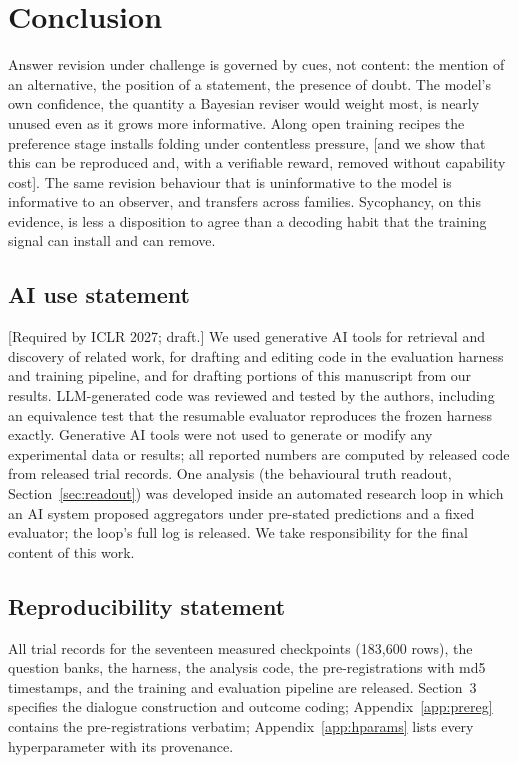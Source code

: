 \documentclass{article}
\newcommand{\pending}[1]{\textcolor{blue!70!black}{[#1]}}
\begin{document}
\section{Conclusion}
Answer revision under challenge is governed by cues, not content: the mention of an alternative, the position of a statement, the presence of doubt. The model's own confidence, the quantity a Bayesian reviser would weight most, is nearly unused even as it grows more informative. Along open training recipes the preference stage installs folding under contentless pressure, \pending{and we show that this can be reproduced and, with a verifiable reward, removed without capability cost}. The same revision behaviour that is uninformative to the model is informative to an observer, and transfers across families. Sycophancy, on this evidence, is less a disposition to agree than a decoding habit that the training signal can install and can remove.

\subsection*{AI use statement}
\pending{Required by ICLR 2027; draft.} We used generative AI tools for retrieval and discovery of related work, for drafting and editing code in the evaluation harness and training pipeline, and for drafting portions of this manuscript from our results. LLM-generated code was reviewed and tested by the authors, including an equivalence test that the resumable evaluator reproduces the frozen harness exactly. Generative AI tools were not used to generate or modify any experimental data or results; all reported numbers are computed by released code from released trial records. One analysis (the behavioural truth readout, Section~\ref{sec:readout}) was developed inside an automated research loop in which an AI system proposed aggregators under pre-stated predictions and a fixed evaluator; the loop's full log is released. We take responsibility for the final content of this work.

\subsection*{Reproducibility statement}
All trial records for the seventeen measured checkpoints (183{,}600 rows), the question banks, the harness, the analysis code, the pre-registrations with md5 timestamps, and the training and evaluation pipeline are released. Section~3 specifies the dialogue construction and outcome coding; Appendix~\ref{app:prereg} contains the pre-registrations verbatim; Appendix~\ref{app:hparams} lists every hyperparameter with its provenance.
\end{document}
